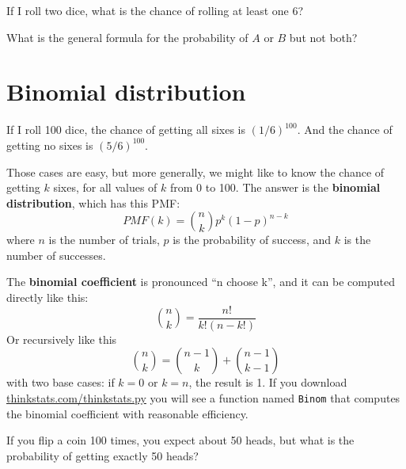 \documentclass[12pt]{book}
\begin{document}

\begin{ex}


If I roll two dice, what is the chance of rolling at least one 6?


\end{ex}

\begin{ex}
What is the general formula for the probability of $A$ or $B$ but not both?


\end{ex}


\section{Binomial distribution}

If I roll 100 dice, the chance of getting all sixes is
$(1/6)^{100}$.  And the chance of getting no sixes is $(5/6)^{100}$.

Those cases are easy, but more generally, we might like to know the
chance of getting $k$ sixes, for all values of $k$ from 0 to 100.  The
answer is the {\bf binomial distribution}, which has this PMF:
%
\[ PMF(k) = \binom{n}{k} p^k (1-p)^{n-k}\]
%
where $n$ is the number of trials, $p$ is the probability of success,
and $k$ is the number of successes.


The {\bf binomial coefficient} is pronounced ``n choose k'', and it
can be computed directly like this:
%
\[ \binom{n}{k} = \frac{n!}{k!(n-k!)}  \]
%
Or recursively like this
%
\[ \binom{n}{k} = \binom{n-1}{k} + \binom{n-1}{k-1} \]
%
with two base cases: if $k=0$ or $k=n$, the result is 1.  If you
download \url{thinkstats.com/thinkstats.py} you will see a function
named {\tt Binom} that computes the binomial coefficient with reasonable
efficiency.

\begin{ex}

If you flip a coin 100 times, you expect about 50 heads, but what
is the probability of getting exactly 50 heads?


\end{ex}
\end{document}
